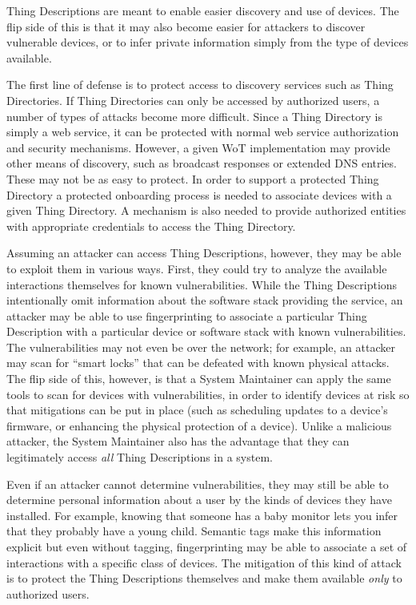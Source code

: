 Thing Descriptions are meant to enable easier discovery and use of 
devices.  The flip side of this is that it may also become easier
for attackers to discover vulnerable devices, or to infer private information
simply from the type of devices available.

The first line of defense is to protect access to discovery services such
as Thing Directories.  If Thing Directories can only be accessed by authorized
users, a number of types of attacks become more difficult.  Since a Thing
Directory is simply a web service, it can be protected with normal web service
authorization and security mechanisms.  
However, a given WoT implementation may provide other means of 
discovery, such as broadcast responses or extended DNS entries.
These may not be as easy to protect.
In order to support a protected Thing Directory
a protected onboarding process is needed to associate devices with a given
Thing Directory.
A mechanism is also needed to provide authorized entities with appropriate
credentials to access the Thing Directory.

Assuming an attacker can access Thing Descriptions, however, they may be
able to exploit them in various ways.  First, they could try to analyze the 
available interactions themselves for known vulnerabilities.  While the 
Thing Descriptions intentionally omit information about the software stack
providing the service, an attacker may be able to use fingerprinting to
associate a particular Thing Description with a particular device or software stack
with known vulnerabilities.  The vulnerabilities may not even be over the network;
for example, an attacker may scan for ``smart locks'' that can be defeated
with known physical attacks.
The flip side of this, however, is that a System Maintainer can apply the same
tools to scan for devices with vulnerabilities, in order to identify devices
at risk so that mitigations can be put in place (such as scheduling updates to
a device's firmware, or enhancing the physical protection of a device).
Unlike a malicious attacker, the System Maintainer also has the advantage that
they can legitimately access \emph{all} Thing Descriptions in a system.

Even if an attacker cannot determine vulnerabilities, they may still be able
to determine personal information about a user by the kinds of devices they
have installed.  For example, knowing that someone has a baby monitor lets you
infer that they probably have a young child.
Semantic tags make this information explicit but even without tagging,
fingerprinting may be able to associate a set of interactions with
a specific class of devices.  The mitigation of this kind of attack is to
protect the Thing Descriptions themselves and make them available
\emph{only} to authorized users.
